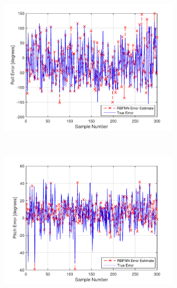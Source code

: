 \begin{figure}
  \begin{subfigure}{0.3\textwidth}
    \includegraphics[width=\textwidth]{figures/chapter4/roll_train}
    \caption{}
  \end{subfigure}
~
  \begin{subfigure}{0.3\textwidth}
    \includegraphics[width=\textwidth]{figures/chapter4/pitch_train}
    \caption{}
  \end{subfigure}
~
  \begin{subfigure}{0.3\textwidth}

\end{subfigure}
\end{figure}
